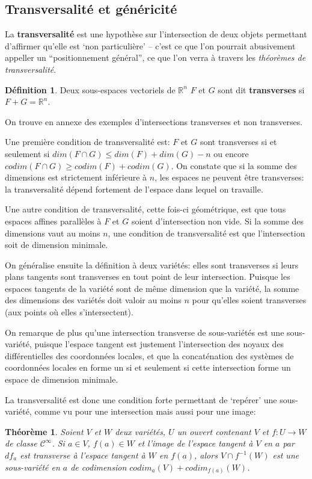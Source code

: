 \documentclass{article}
\newcommand{\cinf}{\mathcal{C}^\infty}
\newcommand{\R}{\mathbb{R}}
\newtheorem{thm}{Théorème}
\theoremstyle{definition}
\newtheorem{defn}{Définition}
\begin{document}
\subsection{Transversalité et généricité}

La \textbf{transversalité} est une hypothèse sur l'intersection de deux objets permettant d'affirmer qu'elle est `non particulière' -- c'est ce que l'on pourrait abusivement appeller un ``positionnement général'', ce que l'on verra à travers les \textit{théorèmes de transversalité}.
\begin{defn}
	Deux sous-espaces vectoriels de $\R^n$ $F$ et $G$ sont dit \textbf{transverses} si $F+G=\R^n$.
\end{defn}

On trouve en annexe des exemples d'intersections transverses et non transverses.

Une première condition de transversalité est: $F$ et $G$ sont transverses si et seulement si $dim(F\cap G)\leq dim(F)+dim(G)-n$ ou encore $codim(F\cap G)\geq codim(F)+codim(G)$.
On constate que si la somme des dimensions est strictement inférieure à $n$, les espaces ne peuvent être transverses: la transversalité dépend fortement de l'espace dans lequel on travaille.

Une autre condition de transversalité, cette fois-ci géométrique, est que tous espaces affines parallèles à $F$ et $G$ soient d'intersection non vide.
Si la somme des dimensions vaut au moins $n$, une condition de transversalité est que l'intersection soit de dimension minimale.

On généralise ensuite la définition à deux variétés: elles sont transverses si leurs plans tangents sont transverses en tout point de leur intersection.
Puisque les espaces tangents de la variété sont de même dimension que la variété, la somme des dimensions des variétés doit valoir au moins $n$ pour qu'elles soient transverses (aux points où elles s'intersectent).

On remarque de plus qu'une intersection transverse de sous-variétés est une sous-variété, puisque l'espace tangent est justement l'intersection des noyaux des différentielles des coordonnées locales, et que la concaténation des systèmes de coordonnées locales en forme un si et seulement si cette intersection forme un espace de dimension minimale.

La transversalité est donc une condition forte permettant de `repérer' une sous-variété, comme vu pour une intersection mais aussi pour une image:
\begin{thm}
	Soient $V$ et $W$ deux variétés, $U$ un ouvert contenant $V$ et $f:U\to W$ de classe $\cinf$.
	Si $a\in V$, $f(a)\in W$ et l'image de l'espace tangent à $V$ en $a$ par $df_a$ est transverse à l'espace tangent à $W$ en $f(a)$, alors $V\cap f^{-1}(W)$ est une sous-variété en $a$ de codimension $codim_a(V) + codim_{f(a)}(W)$.
\end{thm}
\end{document}
